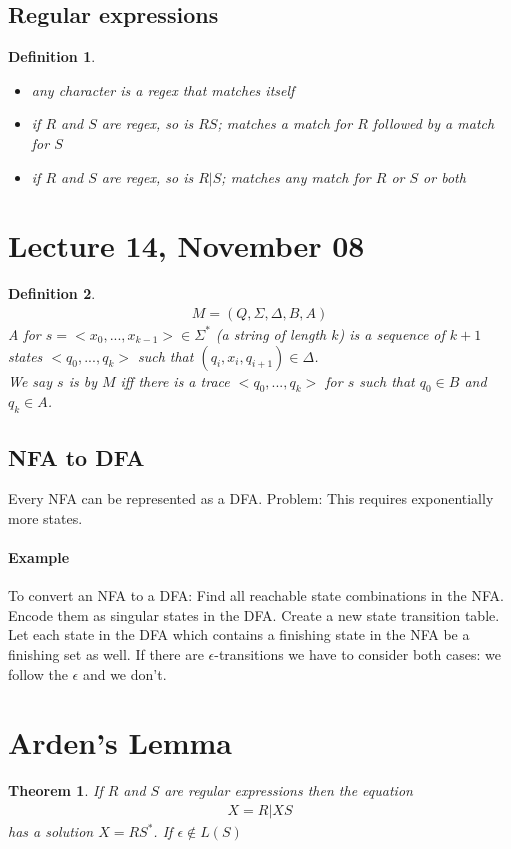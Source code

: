 \documentclass{article}
\newcounter{example}[section]\setcounter{example}{0}
\newenvironment{example}{
\noindent\refstepcounter{example}
\paragraph*{Example}}{}
\theoremstyle{sltheorem}
\newtheorem{definition}{Definition}
\newtheorem{theorem}{Theorem}
\begin{document}
\subsection{Regular expressions}
\begin{definition}
    \begin{itemize}
        \item any character is a regex that matches itself
        \item if $R$ and $S$ are regex, so is $RS$; matches a match for $R$ followed by a match for $S$
        \item if $R$ and $S$ are regex, so is $R|S$; matches any match for $R$ or $S$ or both
    \end{itemize}
\end{definition}
\section{Lecture 14, November 08}
\begin{definition}
    \begin{align*}
        M=(Q,\Sigma, \Delta, B, A)
    \end{align*}
    A  for $s=<x_0,..., x_{k-1}>\in \Sigma^*$ (a string of length $k$) is a sequence of $k+1$ states $<q_0, ..., q_k>$ such that $(q_i, x_i, q_{i+1})\in\Delta$.\\
    We say $s$ is  by $M$ iff there is a trace $<q_0, ..., q_k>$ for $s$ such that $q_0\in B$ and $q_k\in A$.
\end{definition}
\subsection{NFA to DFA}
Every NFA can be represented as a DFA. Problem: This requires exponentially more states.
\begin{example}
    To convert an NFA to a DFA: Find all reachable state combinations in the NFA. Encode them as singular states in the DFA. Create a new state transition table. Let each state in the DFA which contains a finishing state in the NFA be a finishing set as well.
\end{example}
If there are $\epsilon$-transitions we have to consider both cases: we follow the $\epsilon$ and we don't.
\section{Arden's Lemma}
\begin{theorem}
    If $R$ and $S$ are regular expressions then the equation\begin{align*}
        X = R | X S
    \end{align*}
    has a solution $X = R S^*$. If $\epsilon\not\in L(S)$ 
\end{theorem}
\end{document}
